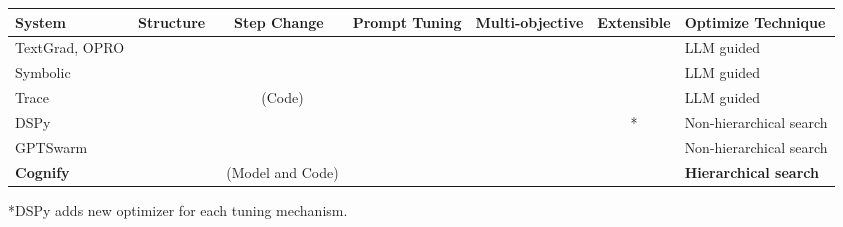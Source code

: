 
\newcommand{\cmark}{\ding{51}}
\newcommand{\cmarkbold}{\ding{52}}
\newcommand{\xmark}{\ding{55}}

\begin{table*}[h]
    \centering
    \small
    \begin{tabular}{|l|c|c|c|c|c|l|}
        \hline
        \textbf{System} & \textbf{Structure} & \textbf{Step Change} & \textbf{Prompt Tuning} & \textbf{Multi-objective} & \textbf{Extensible} & \textbf{Optimize Technique} \\
        \hline
        TextGrad, OPRO  & \xmark & \xmark & \cmark & \xmark & \xmark & LLM guided \\
        Symbolic  & \cmark & \xmark & \cmark & \xmark & \xmark & LLM guided \\
        Trace     & \xmark & \cmark\ (Code) & \cmark & \xmark & \xmark & LLM guided \\
        DSPy      & \xmark & \xmark & \cmark & \xmark & \xmark* & Non-hierarchical search \\
        GPTSwarm      & \cmark & \xmark & \cmark & \xmark & \xmark & Non-hierarchical search \\
        \textbf{Cognify}   & \cmarkbold & \cmarkbold\ (Model and Code) & \cmarkbold & \cmarkbold & \cmarkbold & \textbf{Hierarchical search} \\
        \hline
    \end{tabular} 
\vspace{0.1in}
     {*DSPy adds new optimizer for each tuning mechanism.}
    \label{tbl-comparison}
\end{table*}

